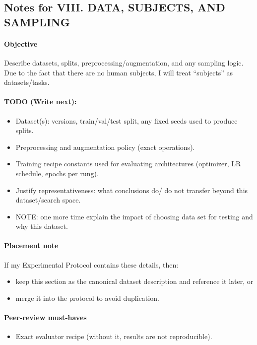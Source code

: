 \subsection*{Notes for VIII. DATA, SUBJECTS, AND SAMPLING}
\paragraph{Objective}
Describe datasets, splits, preprocessing/augmentation, and any sampling logic. Due to the fact that there are no human subjects, I will treat “subjects” as datasets/tasks.

\paragraph{TODO (Write next):}
\begin{itemize}
  \item Dataset(s): versions, train/val/test split, any fixed seeds used to produce splits.
  \item Preprocessing and augmentation policy (exact operations).
  \item Training recipe constants used for evaluating architectures (optimizer, LR schedule, epochs per rung).
  \item Justify representativeness: what conclusions do/ do not transfer beyond this dataset/search space.
  \item NOTE: one more time explain the impact of choosing data set for testing and why this dataset.
\end{itemize}

\paragraph{Placement note}
If my Experimental Protocol contains these details, then:
\begin{itemize}
  \item keep this section as the canonical dataset description and reference it later, or
  \item merge it into the protocol to avoid duplication.
\end{itemize}

\paragraph{Peer-review must-haves}
\begin{itemize}
  \item Exact evaluator recipe (without it, results are not reproducible).
\end{itemize}
